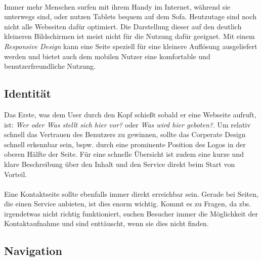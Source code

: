 \\
Immer mehr Menschen surfen mit ihrem Handy im Internet, während sie unterwegs sind, oder nutzen Tablets bequem auf dem Sofa. Heutzutage sind noch nicht alle Webseiten dafür optimiert. Die Darstellung dieser auf den deutlich kleineren Bildschirmen ist meist nicht für die Nutzung dafür geeignet. Mit einem \textit{Responsive Design} kann eine Seite speziell für eine kleinere Auflösung ausgeliefert werden und bietet auch dem mobilen Nutzer eine komfortable und benutzerfreundliche Nutzung.


\subsection{Identität}

Das Erste, was dem User durch den Kopf schießt sobald er eine Webseite aufruft, ist: \textit{\glqq Wer oder Was stellt sich hier vor?\grqq{}} oder \textit{\glqq Was wird hier geboten?\grqq{}}. Um relativ schnell das Vertrauen des Benutzers zu gewinnen, sollte das Corperate Design schnell erkennbar sein, bspw. durch eine prominente Position des Logos in der oberen Hälfte der Seite. Für eine schnelle Übersicht ist zudem eine kurze und klare Beschreibung über den Inhalt und den Service direkt beim Start von Vorteil.\\
\\
Eine Kontaktseite sollte ebenfalls immer direkt erreichbar sein. Gerade bei Seiten, die einen Service anbieten, ist dies enorm wichtig. Kommt es zu Fragen, da zbs. irgendetwas nicht richtig funktioniert, suchen Besucher immer die Möglichkeit der Kontaktaufnahme und sind enttäuscht, wenn sie dies nicht finden.


\subsection{Navigation}

